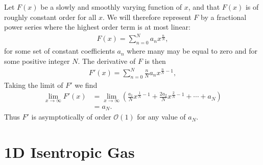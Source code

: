 \chapter{} \label{appendix:asymptotic_deriv}

Let $F(x)$ be a slowly and smoothly varying function of $x$, and that $F(x)$ is of roughly constant order for all $x$. 
We will therefore represent $F$ by a fractional power series where the highest order term is at most linear:
\begin{align}
    F(x) = \sum_{n=0}^N a_n x^{\frac{n}{N}}, \label{eq:powerseries}
\end{align}
for some set of constant coefficients ${a_n}$ where many may be equal to zero and for some positive integer $N$. 
The derivative of $F$ is then
\begin{align}
    F'(x) = \sum_{n=0}^N \frac{n}{N} a_n x^{\frac{n}{N}-1},
\end{align}
Taking the limit of $F'$ we find
\begin{align}
    \lim_{x\rightarrow \infty} F'(x) &= \lim_{x\rightarrow \infty} \left( \frac{a_1}{N} x^{\frac{1}{N}-1} + \frac{2a_2}{N} x^{\frac{2}{N}-1} + \cdots + a_N \right) \\
    &= a_N.
\end{align}
Thus $F'$ is asymptotically of order $\mathcal{O}(1)$ for any value of $a_N$.

\chapter{1D Isentropic Gas} \label{appendix:isentropic_riemann}

